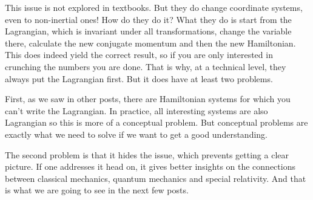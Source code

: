 \documentclass[aps,pra,10pt,floatfix,nofootinbib]{revtex4-1}
\theoremstyle{definition}
\begin{document}
This issue is not explored in textbooks. But they do change coordinate systems, even to non-inertial ones! How do they do it? What they do is start from the Lagrangian, which is invariant under all transformations, change the variable there, calculate the new conjugate momentum and then the new Hamiltonian. This does indeed yield the correct result, so if you are only interested in crunching the numbers you are done. That is why, at a technical level, they always put the Lagrangian first. But it does have at least two problems.

First, as we saw in other posts, there are Hamiltonian systems for which you can't write the Lagrangian. In practice, all interesting systems are also Lagrangian so this is more of a conceptual problem. But conceptual problems are exactly what we need to solve if we want to get a good understanding.

The second problem is that it hides the issue, which prevents getting a clear picture. If one addresses it head on, it gives better insights on the connections between classical mechanics, quantum mechanics and special relativity. And that is what we are going to see in the next few posts.
\end{document}
